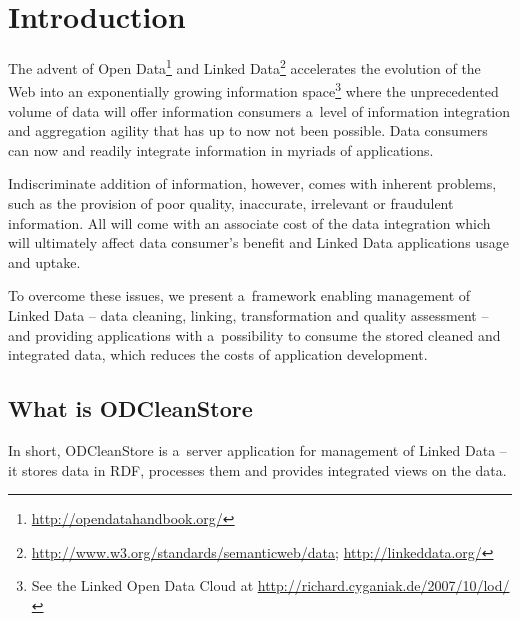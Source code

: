 
\newcommand{\version}{0.3.7}
\newcommand{\documentname}{\refusermanual}

\hypersetup{pdftitle=ODCleanStore -- \documentname}





\renewcommand{\contentsname}{Contents}
\tableofcontents
\bigskip

\newpage


\chapter{Introduction}
\label{chap:introduction}

The advent of Open Data\footnote{\url{http://opendatahandbook.org/}} and Linked Data\footnote{\url{http://www.w3.org/standards/semanticweb/data}; \url{http://linkeddata.org/}}  accelerates the evolution of the Web into an exponentially growing information space\footnote{See the Linked Open Data Cloud at \url{http://richard.cyganiak.de/2007/10/lod/}} where the unprecedented volume of data will offer information consumers a~level of information integration and aggregation agility that has up to now not been possible. Data consumers can now  and readily integrate information in myriads of applications.

Indiscriminate addition of information, however, comes with inherent problems, such as the provision of poor quality, inaccurate, irrelevant or fraudulent information. All will come with an associate cost of the data integration which will ultimately affect data consumer's benefit and Linked Data applications usage and uptake.

To overcome these issues, we present a~framework enabling management of Linked Data -- data cleaning, linking, transformation and quality assessment -- and providing  applications with a~possibility to consume the stored cleaned and integrated data, which reduces the costs of application development.

\section{What is ODCleanStore}

In short, ODCleanStore is a~server application for management of Linked Data -- it stores data in RDF, processes them and provides integrated views on the data.

